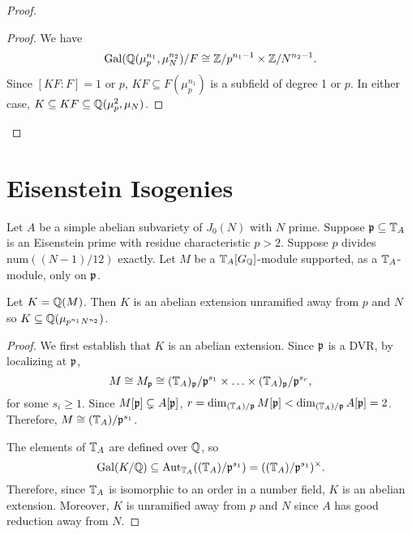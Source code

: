 \documentclass[thesis.tex]{subfiles}
\begin{document}
\begin{proof}
\begin{proof}
        We have 
        \[
            \operatorname{Gal}(\mathbb{Q}(\mu_p ^{n_1}, \mu_N ^{n_2})/F \cong \mathbb{Z}/p^{n_1-1} \times
            \mathbb{Z}/N^{n_2-1}.
        \]
        Since $[KF:F]=1$ or $p$, $KF\subseteq F(\mu_p ^{n_1})$ is a subfield of
        degree 1 or $p$. In either case, $K\subseteq KF \subseteq \mathbb{Q}(\mu_p ^2,
        \mu_N)$.
    \end{proof}
\end{proof}




\section{Eisenstein Isogenies}%
\label{sec:eisenstein_isogenies}


\begin{proposition}
    Let $A$ be a simple abelian subvariety of $J_0(N)$ with $N$ prime. Suppose
    $\mathfrak{p}\subseteq \mathbb{T}_A$ is an Eisenstein prime with residue characteristic
    $p>2$. Suppose $p$ divides $\mathrm{num}((N-1)/12)$ exactly. Let $M$ be a
    $\mathbb{T}_A[G_{\mathbb{Q}}]$-module supported, as a $\mathbb{T}_A$-module, only on $\mathfrak{p}$.
\end{proposition}

\begin{lemma}
    \label{lem:abelian_extension}
    Let $K=\mathbb{Q}(M)$. Then $K$ is an abelian extension unramified away from $p$
    and $N$ so $K\subseteq \mathbb{Q}(\mu_{p^{n_1}N^{n_2}})$.
\end{lemma}
\begin{proof}
    We first establish that $K$ is an abelian extension. Since $\mathfrak{p}$ is a DVR,
    by localizing at $\mathfrak{p}$,
    \[
        M \cong M_{\mathfrak{p}} \cong (\mathbb{T}_A)_{\mathfrak{p}}/\mathfrak{p}^{s_1}\times \ldots\times
        (\mathbb{T}_A)_{\mathfrak{p}}/\mathfrak{p}^{s_r},
    \]
    for some $s_i\geq 1$. Since $M[\mathfrak{p}]\subsetneq A[\mathfrak{p}]$, $r=\dim_{(\mathbb{T}_A)/\mathfrak{p}}
    M[\mathfrak{p}]<\dim_{(\mathbb{T}_A)/\mathfrak{p}} A[\mathfrak{p}]=2$. Therefore, $M\cong (\mathbb{T}_A)/\mathfrak{p}^{s_1}$.

    The elements of $\mathbb{T}_A$ are defined over $\mathbb{Q}$, so
    \[
        \operatorname{Gal}(K/\mathbb{Q}) \subseteq \operatorname{Aut}_{\mathbb{T}_A}((\mathbb{T}_A)/\mathfrak{p}^{s_1}) =
        ((\mathbb{T}_A)/\mathfrak{p}^{s_1})^\times.
    \]
    Therefore, since $\mathbb{T}_A$ is isomorphic to an order in a number field, $K$
    is an abelian extension. Moreover, $K$ is unramified away from $p$ and $N$
    since $A$ has good reduction away from $N$.
\end{proof}
\end{document}
